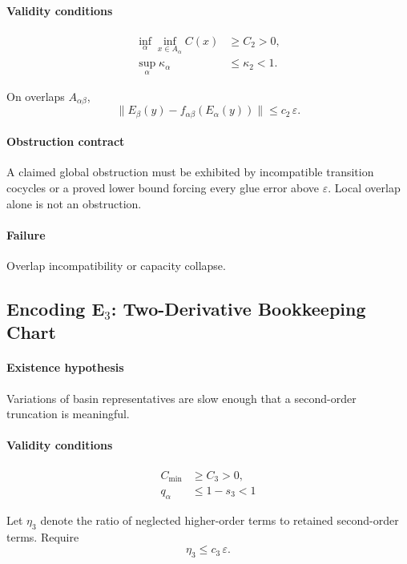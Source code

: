 \documentclass[11pt]{article}
\theoremstyle{plain}
\theoremstyle{plain}
\begin{document}
\paragraph{Validity conditions}
\begin{align}
\inf_\alpha \inf_{x\in A_\alpha} C(x) &\ge C_2 > 0, \\
\sup_\alpha \kappa_\alpha &\le \kappa_2 < 1.
\end{align}

On overlaps $A_{\alpha\beta}$,
\[
\|E_\beta(y) - f_{\alpha\beta}(E_\alpha(y))\|
\le c_2\,\varepsilon .
\]

\paragraph{Obstruction contract}
A claimed global obstruction must be exhibited by incompatible transition
cocycles or a proved lower bound forcing every glue error above
$\varepsilon$.  Local overlap alone is not an obstruction.

\paragraph{Failure}
Overlap incompatibility or capacity collapse.


\subsection{Encoding \texorpdfstring{E$_3$}{E3}: Two-Derivative Bookkeeping Chart}

\paragraph{Existence hypothesis}
Variations of basin representatives are slow enough that
a second-order truncation is meaningful.

\paragraph{Validity conditions}
\begin{align}
C_{\min} &\ge C_3 > 0, \\
q_\alpha &\le 1-s_3<1
\end{align}

Let $\eta_3$ denote the ratio of neglected higher-order terms
to retained second-order terms.
Require
\[
\eta_3 \le c_3\,\varepsilon .
\]
\end{document}
